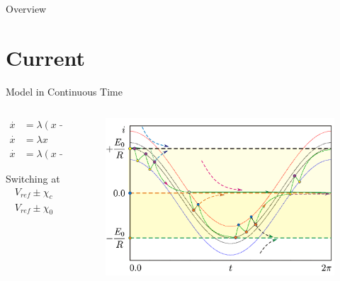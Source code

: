 
\begin{frame}{Overview}
	\tableofcontents
\end{frame}




\section{Current}

\begin{frame}{Model in Continuous Time}
	\vspace{-1em}
	\begin{columns}
		\begin{column}{.3 \textwidth}
			\begin{align*}
				\overset{\cdot}{x} & = \lambda (x - 1) \quad & \text{if } & K_{F} = +1 \\
				\overset{\cdot}{x} & = \lambda x       \quad & \text{if } & K_{F} = 0  \\
				\overset{\cdot}{x} & = \lambda (x + 1) \quad & \text{if } & K_{F} = -1
			\end{align*}

			Switching at
			\begin{align*}
				V_{ref} \pm \chi_{c} \\
				V_{ref} \pm \chi_{0}
			\end{align*}
		\end{column}
		\begin{column}{.7 \textwidth}
			\begin{figure}
				\includegraphics[width=0.7 \textwidth]{Figs/continuous_model.png}
			\end{figure}

			\flushright{[Zhusubaliyev]}
		\end{column}
	\end{columns}
\end{frame}

